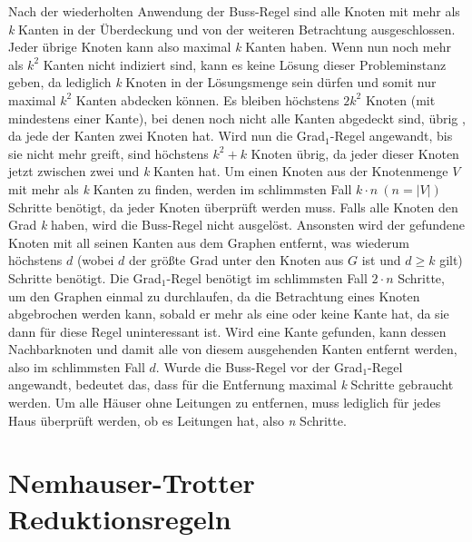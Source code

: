 Nach der wiederholten Anwendung der Buss-Regel sind alle Knoten mit mehr als \emph{k} Kanten in der Überdeckung und von der weiteren Betrachtung ausgeschlossen. Jeder übrige Knoten kann also maximal \emph{k} Kanten haben. Wenn nun noch mehr als $k^{2}$ Kanten nicht indiziert sind, kann es keine Lösung dieser Probleminstanz geben, da lediglich \emph{k} Knoten in der Lösungsmenge sein dürfen und somit nur maximal $k^{2}$ Kanten  abdecken können. Es bleiben höchstens $2 k^{2}$ Knoten (mit mindestens einer Kante), bei denen noch nicht alle Kanten abgedeckt sind, übrig \cite{param}, da jede der Kanten zwei Knoten hat. Wird nun die Grad$_{1}$-Regel angewandt, bis sie nicht mehr greift, sind höchstens $k^{2} + k$ Knoten übrig, da jeder dieser Knoten jetzt zwischen zwei und \emph{k} Kanten hat.
Um einen Knoten aus der Knotenmenge $V$ mit mehr als \emph{k} Kanten zu finden, werden im schlimmsten Fall $k \cdot n\ (n=|V|)$ Schritte benötigt, da jeder Knoten überprüft werden muss. Falls alle Knoten den Grad \emph{k} haben, wird die Buss-Regel nicht ausgelöst. Ansonsten wird der gefundene Knoten mit all seinen Kanten aus dem Graphen entfernt, was wiederum höchstens $d$ (wobei $d$ der größte Grad unter den Knoten aus $G$ ist und $d \geq k$ gilt) Schritte benötigt. Die Grad$_{1}$-Regel benötigt im schlimmsten Fall $2 \cdot n$ Schritte, um den Graphen einmal zu durchlaufen, da die Betrachtung eines Knoten abgebrochen werden kann, sobald er mehr als eine oder keine Kante hat, da sie dann für diese Regel uninteressant ist. Wird eine Kante gefunden, kann dessen Nachbarknoten und damit alle von diesem ausgehenden Kanten entfernt werden, also im schlimmsten Fall $d$. Wurde die Buss-Regel vor der Grad$_{1}$-Regel angewandt, bedeutet das, dass für die Entfernung maximal \emph{k} Schritte gebraucht werden. Um alle Häuser ohne Leitungen zu entfernen, muss lediglich für jedes Haus überprüft werden, ob es Leitungen hat, also \emph{n} Schritte.

\section{Nemhauser-Trotter Reduktionsregeln}
\label{ch:Grundlagen:sec:Nemhauser-Trotter Reduktionsregeln}

